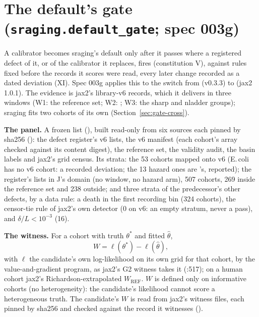\section{The default's gate (\texttt{sraging.default\_gate}; spec 003g)}\label{sec:gate}

\tplPurpose
A calibrator becomes sraging's default only after it passes where a registered defect of it, or of the calibrator it
replaces, fires (constitution V), against rules fixed before the records it scores were read, every later change
recorded as a dated deviation (XI). Spec 003g applies this
to the switch from  (v0.3.3) to  (jax2 1.0.1). The evidence is jax2's library-v6
records, which it delivers in three windows (W1: the reference set; W2: ; W3: the sharp and nladder groups);
sraging fits two cohorts of its own (Section~\ref{sec:gate-cross}).

\tplMath
\textbf{The panel.} A frozen list (), built read-only from six sources each
pinned by sha256 (): the defect register's v6 lists, the v6 manifest (each cohort's array
checked against its content digest), the reference set, the validity audit, the basin labels and jax2's grid census.
Its strata: the 53  cohorts mapped onto v6 (E.\,coli has no v6 cohort: a recorded deviation; the 13
hazard ones are 's, reported); the register's lists in J's domain (no window, no hazard arm), 507 cohorts, 269
inside the reference set and 238 outside; and three strata of the predecessor's other defects, by a data rule: a death
in the first recording bin (324 cohorts), the censor-tie rule of jax2's own detector (0 on v6: an empty stratum, never
a pass), and $\delta/L<10^{-3}$ (16).

\textbf{The witness.} For a cohort with truth $\theta^\ast$ and fitted $\hat\theta$,
\begin{equation}
  W=\ell(\theta^\ast)-\ell(\hat\theta),
\end{equation}
with $\ell$ the candidate's own log-likelihood on its own grid for that cohort, by the value-and-gradient program, as
jax2's G2 witness takes it (:517); on a human cohort jax2's Richardson-extrapolated
$W_{\mathrm{REF}}$. $W$ is defined only on informative cohorts (no heterogeneity): the candidate's likelihood cannot
score a heterogeneous truth. The candidate's $W$ is read from jax2's witness files, each pinned by sha256 and checked
against the record it witnesses ().

